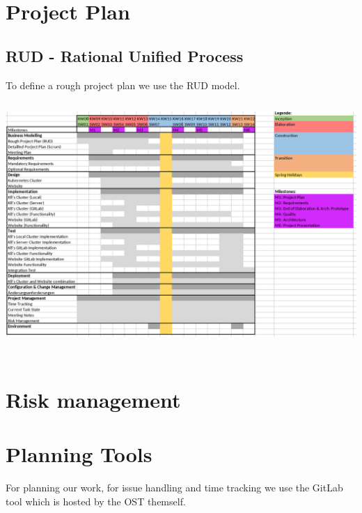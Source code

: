 \section{Project Plan}
\subsection{RUD - Rational Unified Process}
To define a rough project plan we use the RUD model. \newline
\includegraphics[height=10cm]{resources/project-plan-RUD.png}

\section{Risk management}


\section{Planning Tools}
For planning our work, for issue handling and time tracking we use the GitLab tool which is hosted by the OST themself.
